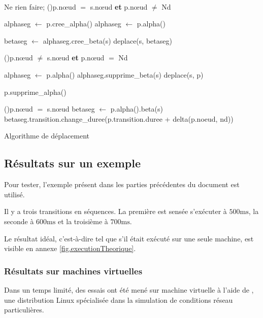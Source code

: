 \begin{algorithm}[H]
	\SetAlgoLined
	
	~ \\
	
	{
		{
			Ne rien faire;	
		}
		\uSinonSi(){p.nœud $=$ s.nœud \textbf{et} p.nœud $\neq$ Nd}
		{
			{
				alphaseg $\longleftarrow$ p.cree\_alpha()\;
			}
			\Sinon
			{
				alphaseg $\longleftarrow$ p.alpha()\;
			}
			
			betaseg $\longleftarrow$ alphaseg.cree\_beta(s)\;
			deplace(s, betaseg)\;
					
		}
		\uSinonSi(){p.nœud $\neq$ s.nœud \textbf{et} p.nœud $=$ Nd}
		{
			alphaseg $\longleftarrow$ p.alpha()\;
			alphaseg.supprime\_beta(s)\;
			deplace(s, p) \;
					
			{
				p.supprime\_alpha()\;
			}		
		}
		\SinonSi(){p.nœud $=$ s.nœud}
		{
			betaseg $\longleftarrow$ p.alpha().beta(s)\;
			betaseg.transition.change\_duree(p.transition.duree + delta(p.noeud, nd))\;
		}	
	}
	
	\caption{Algorithme de déplacement}
	\label{alg.deplacement}
\end{algorithm}

\subsection{Résultats sur un exemple}
Pour tester, l'exemple présent dans les parties précédentes du document est utilisé.

Il y a trois transitions en séquences. La première est sensée s'exécuter à $\num{500}\si{\milli\second}$, la seconde à $\num{600}\si{\milli\second}$ et la troisième à $\num{700}\si{\milli\second}$.

Le résultat idéal, c'est-à-dire tel que s'il était exécuté sur une seule machine, est visible en annexe \ref{fig.executionTheorique}.

\subsubsection{Résultats sur machines virtuelles}
Dans un temps limité, des essais ont été mené sur machine virtuelle à l'aide de , une distribution Linux spécialisée dans la simulation de conditions réseau particulières.

